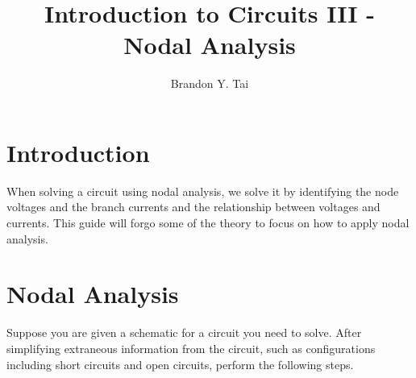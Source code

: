 \documentclass[12pt,letterpaper]{article}
\begin{document}
\title{Introduction to Circuits III - Nodal Analysis}
\author{Brandon Y. Tai}
\maketitle

\setcounter{section}{-1}

\section{Introduction}
	When solving a circuit using nodal analysis, we solve it by identifying the node voltages and the branch currents and the relationship between voltages and currents. This guide will forgo some of the theory to focus on how to apply nodal analysis.

\section{Nodal Analysis}
Suppose you are given a schematic for a circuit you need to solve. After simplifying extraneous information from the circuit, such as configurations including short circuits and open circuits, perform the following steps.
\end{document}
